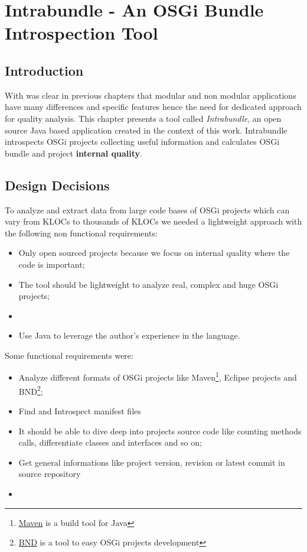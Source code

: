 \chapter{Intrabundle - An OSGi Bundle Introspection Tool}


\section{Introduction}
With was clear in previous chapters that modular and non modular applications have many differences and specific features hence the need for dedicated approach for quality analysis. This chapter presents a tool called \emph{Intrabundle}\citep{intrabundle github 2014}, an open source Java based application created in the context of this work. Intrabundle introspects OSGi projects collecting useful information and calculates OSGi bundle and project \textbf{internal quality}.  


\section{Design Decisions}
To analyze and extract data from large code bases of OSGi projects which can vary from KLOCs to thousands of KLOCs we needed a lightweight approach with the following non functional requirements:

\begin{itemize}
\item Only open sourced projects because we focus on internal quality where the code is important;
\item The tool should be lightweight to analyze real, complex and huge OSGi projects;
\item 
\item Use Java to leverage the author's experience in the language.
\end{itemize}

Some functional requirements were:

\begin{itemize}
\item Analyze different formats of OSGi projects like Maven\footnote{\href{http://maven.apache.org/index.html}{Maven} is a build tool for Java}, 
Eclipse projects and BND\footnote{\href{http://bndtools.org/}{BND} is a tool to easy OSGi projects development}; 
\item Find and Introspect manifest files
\item It should be able to dive deep into projects source code like counting methods calls, differentiate classes and interfaces and so on;  
\item Get general informations like project version, revision or latest commit in source repository
\item 
\end{itemize}

